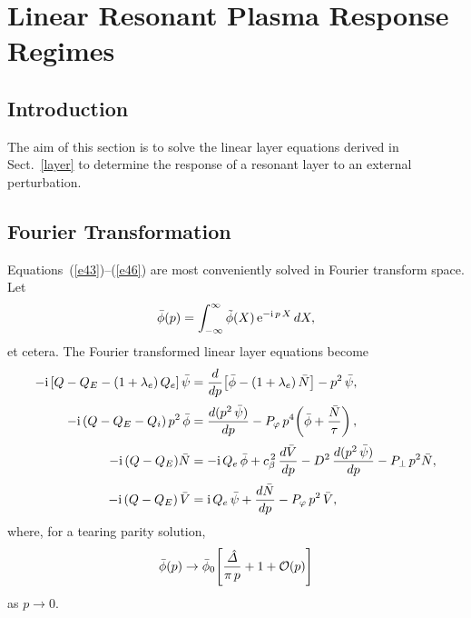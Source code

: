 \documentclass[12pt,prb,aps]{revtex4-1}
\begin{document}
\section{Linear Resonant Plasma Response Regimes}\label{linear}
\subsection{Introduction}
The aim of this section is to solve the linear layer equations derived in Sect.~\ref{layer} to determine the
response of a resonant layer to an external perturbation. 

\subsection{Fourier Transformation}
Equations~(\ref{e43})--(\ref{e46}) are most conveniently solved in Fourier transform space.\cite{cole} 
Let
\begin{equation}
\bar{\phi}(p) = \int_{-\infty}^\infty \tilde{\phi}(X)\,{\rm e}^{-{\rm i}\,p\,X}\,dX,
\end{equation}
et cetera. The Fourier transformed linear layer equations become
\begin{align}\label{e314}
-{\rm i}\,[Q-Q_E-(1+\lambda_e)\,Q_{e}]\,\bar{\psi}&=\frac{d}{dp}\!\left[\bar{\phi}-(1+\lambda_e)\,\bar{N}\right] -p^2\,\bar{\psi},\\[0.5ex]
-{\rm i}\,(Q-Q_E -Q_{i})\,p^2\,\bar{\phi}&=  \frac{d(p^2\,\bar{\psi})}{dp}- P_\varphi\,p^4\!\left(\bar{\phi} + \frac{\bar{N}}{\tau}\right),\\[0.5ex]
-{\rm i}\,(Q-Q_E)\bar{N} &= - {\rm i}\,Q_{e}\,\bar{\phi} + c_\beta^{\,2}\,\frac{d\bar{V}}{dp}-D^{2}\,\frac{d(p^2\,\bar{\psi})}{dp}
  - P_\perp\,p^2\bar{N},\label{e316}\\[0.5ex]
 -{\rm i}\,(Q-Q_E)\,\bar{V} &= {\rm i}\,Q_{e}\,\bar{\psi} +\frac{d\bar{N}}{dp}- P_\varphi\,p^2\,\bar{V},\label{e317}
\end{align}
where, for a tearing parity solution, 
\begin{equation}
\bar{\phi}(p)\rightarrow \bar{\phi}_0\!\left[\frac{\hat{\mit\Delta}}{\pi\,p} + 1+ {\cal O}(p)\right]
\end{equation}
as $p\rightarrow 0$. 
\end{document}
